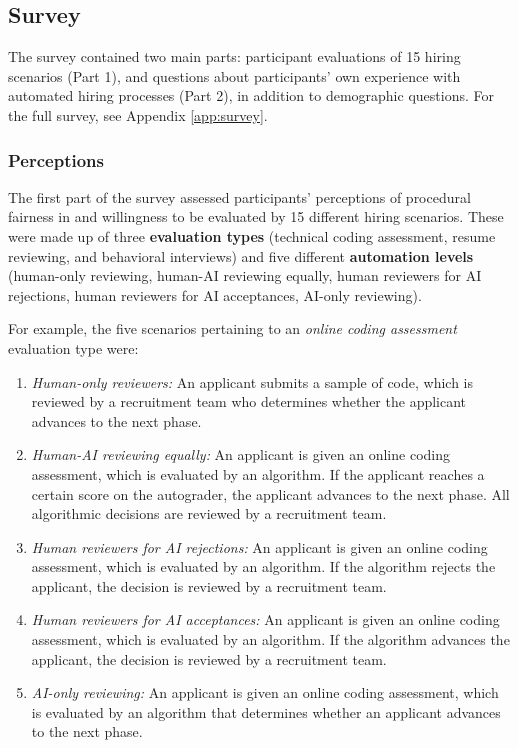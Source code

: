 \subsection{Survey}
The survey contained two main parts: participant evaluations of 15 hiring scenarios (Part 1), and questions about participants' own experience with automated hiring processes (Part 2), in addition to demographic questions. For the full survey, see Appendix \ref{app:survey}.

\subsubsection{Perceptions}
The first part of the survey assessed participants' perceptions of procedural fairness in and willingness to be evaluated by 15 different hiring scenarios. These were made up of three \textbf{evaluation types} (technical coding assessment, resume reviewing, and behavioral interviews) and five different \textbf{automation levels} (human-only reviewing, human-AI reviewing equally, human reviewers for AI rejections, human reviewers for AI acceptances, AI-only reviewing). 

For example, the five scenarios pertaining to an \textit{online coding assessment} evaluation type were: 

\begin{enumerate}
  \item \textit{Human-only reviewers:} An applicant submits a sample of code, which is reviewed by a recruitment team who determines whether the applicant advances to the next phase.
  \item \textit{Human-AI reviewing equally:} An applicant is given an online coding assessment, which is evaluated by an algorithm. If the applicant reaches a certain score on the autograder, the applicant advances to the next phase. All algorithmic decisions are reviewed by a recruitment team.
  \item \textit{Human reviewers for AI rejections:} An applicant is given an online coding assessment, which is evaluated by an algorithm. If the algorithm rejects the applicant, the decision is reviewed by a recruitment team.
  \item \textit{Human reviewers for AI acceptances:} An applicant is given an online coding assessment, which is evaluated by an algorithm. If the algorithm advances the applicant, the decision is reviewed by a recruitment team.
  \item \textit{AI-only reviewing:} An applicant is given an online coding assessment, which is evaluated by an algorithm that determines whether an applicant advances to the next phase.
\end{enumerate}

